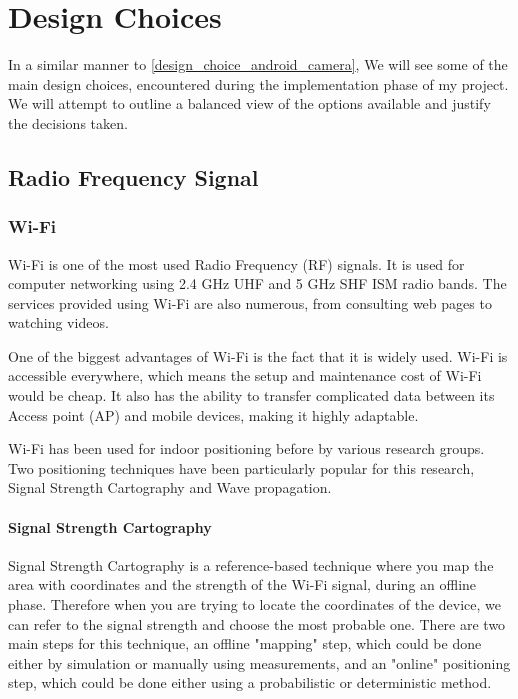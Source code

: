 

\section{Design Choices}
In a similar manner to \ref{design_choice_android_camera}, We will see some of the main design choices, encountered during the implementation phase of my project. We will attempt to outline a balanced view of the options available and justify the decisions taken.
\subsection{Radio Frequency Signal}

\subsubsection{Wi-Fi}

Wi-Fi is one of the most used Radio Frequency (RF) signals.
It is used for computer networking using 2.4 GHz UHF and 5 GHz SHF
ISM radio bands\cite{wifi-wikipedia}. The services provided using Wi-Fi are also
numerous, from consulting web pages to watching videos. 

One of the biggest advantages of Wi-Fi is the fact that it is
widely used. Wi-Fi is accessible everywhere, which means the setup and maintenance cost of Wi-Fi would be cheap. It also has the
ability to transfer complicated data between its Access point (AP)
and mobile devices, making it highly adaptable. 

Wi-Fi has been used for indoor positioning before by various research
groups\cite{wifi-indoor}. Two positioning techniques have been particularly popular for this research, Signal Strength Cartography and Wave propagation. 

\paragraph{Signal Strength Cartography}
Signal Strength Cartography\cite{sig-cart} is a reference-based technique where you map the area
with coordinates and the strength of the Wi-Fi signal, during an offline phase. Therefore when you
are trying to locate the coordinates of the device, we can refer to the signal strength and choose the most probable one. There are two main steps
for this technique, an offline "mapping" step, which could be done either
by simulation or manually using measurements, and an "online" positioning
step, which could be done either using a probabilistic or deterministic
method. 

